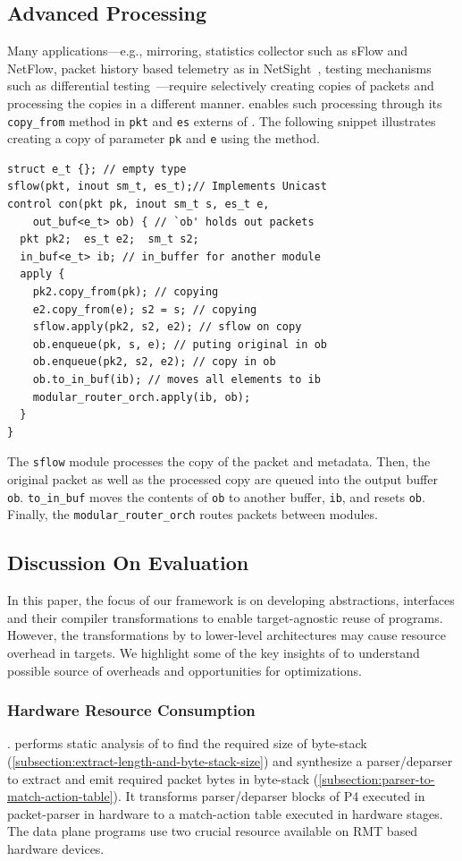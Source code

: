 \documentclass[letterpaper,twocolumn,10pt]{article}
\begin{document}
\subsection{Advanced Processing}
Many applications---e.g., mirroring, statistics collector such as
sFlow and NetFlow, packet history based telemetry as in
NetSight~\cite{179783}, testing mechanisms such as differential
testing~\cite{Zheng:2018:PLV:3281411.3281436}---require selectively
creating copies of packets and processing the copies in a different
manner. \ulang enables such processing through its \texttt{copy\_from}
method in \texttt{pkt} and \texttt{es} externs of \uarch. The
following snippet illustrates creating a copy of parameter \texttt{pk}
and \texttt{e} using the method.
\begin{lstlisting}[frame=none]
struct e_t {}; // empty type
sflow(pkt, inout sm_t, es_t);// Implements Unicast 
control con(pkt pk, inout sm_t s, es_t e, 
    out_buf<e_t> ob) { // `ob' holds out packets
  pkt pk2;  es_t e2;  sm_t s2;
  in_buf<e_t> ib; // in_buffer for another module
  apply {
    pk2.copy_from(pk); // copying
    e2.copy_from(e); s2 = s; // copying
    sflow.apply(pk2, s2, e2); // sflow on copy
    ob.enqueue(pk, s, e); // puting original in ob
    ob.enqueue(pk2, s2, e2); // copy in ob
    ob.to_in_buf(ib); // moves all elements to ib
    modular_router_orch.apply(ib, ob);
  }
}
\end{lstlisting}
The \texttt{sflow} module processes the copy of the packet and
metadata.  Then, the original packet as well as the processed copy are
queued into the output buffer \texttt{ob}. \texttt{to\_in\_buf} moves
the contents of \texttt{ob} to another buffer, \texttt{ib}, and resets
\texttt{ob}. Finally, the \texttt{modular\_router\_orch} routes
packets between modules.





\subsection{Discussion On Evaluation}
In this paper, the focus of our framework is on developing abstractions, interfaces and their compiler transformations to enable target-agnostic reuse of programs. However, the transformations by \ucomp to lower-level architectures may cause resource overhead in targets. 
We highlight some of the key insights of \ucomp to understand possible source of overheads and opportunities for optimizations.

\subsubsection{Hardware Resource Consumption}. 
\ucomp performs static analysis of \uprograms to find the required size of byte-stack (\cref{subsection:extract-length-and-byte-stack-size}) and synthesize a parser/deparser to extract and emit required packet bytes in byte-stack (\cref{subsection:parser-to-match-action-table}). 
It transforms parser/deparser blocks of P4 executed in packet-parser in hardware to a match-action table executed in hardware stages. 
The data plane programs use two crucial resource available on RMT based hardware devices.
\end{document}
